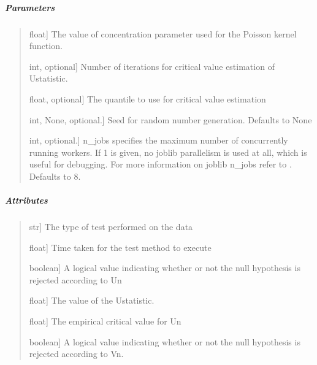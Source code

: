 \documentclass[letterpaper,10pt,english,openany,oneside]{sphinxmanual}
\begin{document}
{{{{\begin{fulllineitems}
\subparagraph{Parameters}
\label{\detokenize{api_reference/generated/QuadratiK.poisson_kernel_test.PoissonKernelTest:parameters}}\begin{quote}
\begin{description}
\sphinxlineitem{rho}{[}float{]}
\sphinxAtStartPar
The value of concentration parameter used for the
Poisson kernel function.

\sphinxlineitem{num\_iter}{[}int, optional{]}
\sphinxAtStartPar
Number of iterations for critical value estimation of U\sphinxhyphen{}statistic.

\sphinxlineitem{quantile}{[}float, optional{]}
\sphinxAtStartPar
The quantile to use for critical value estimation

\sphinxlineitem{random\_state}{[}int, None, optional.{]}
\sphinxAtStartPar
Seed for random number generation. Defaults to None

\sphinxlineitem{n\_jobs}{[}int, optional.{]}
\sphinxAtStartPar
n\_jobs specifies the maximum number of concurrently running workers.
If 1 is given, no joblib parallelism is used at all, which is useful for debugging.
For more information on joblib n\_jobs refer
to \sphinxhyphen{} .
Defaults to 8.

\end{description}
\end{quote}


\subparagraph{Attributes}
\label{\detokenize{api_reference/generated/QuadratiK.poisson_kernel_test.PoissonKernelTest:attributes}}\begin{quote}
\begin{description}
\sphinxlineitem{test\_type\_}{[}str{]}
\sphinxAtStartPar
The type of test performed on the data

\sphinxlineitem{execution\_time}{[}float{]}
\sphinxAtStartPar
Time taken for the test method to execute

\sphinxlineitem{u\_statistic\_h0\_}{[}boolean{]}
\sphinxAtStartPar
A logical value indicating whether or not the null hypothesis
is rejected according to Un

\sphinxlineitem{u\_statistic\_un\_}{[}float{]}
\sphinxAtStartPar
The value of the U\sphinxhyphen{}statistic.

\sphinxlineitem{u\_statistic\_cv\_}{[}float{]}
\sphinxAtStartPar
The empirical critical value for Un

\sphinxlineitem{v\_statistic\_h0\_}{[}boolean{]}
\sphinxAtStartPar
A logical value indicating whether or not the null hypothesis is
rejected according to Vn.


\end{description}
\end{quote}
\end{fulllineitems}}}}}
\end{document}
